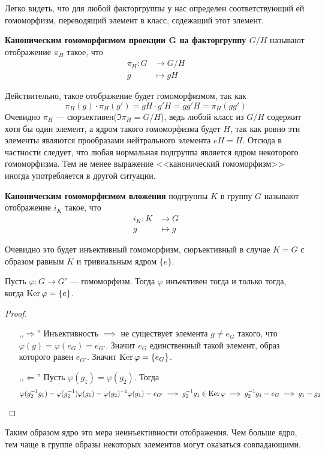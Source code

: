 \documentclass[../main.tex]{subfiles}
\begin{document}
  Легко видеть, что для любой факторгруппы у нас определен соответствующий ей гомоморфизм, переводящий элемент в класс, содежащий этот элемент.
  \begin{definition}
    \textbf{Каноническим гомоморфизмом проекции G на факторгруппу $G/H$} называют отображение $\pi_{H}$ такое, что
    \begin{align*}
        \pi_H\colon G &\longrightarrow G/H \\
        g &\longmapsto gH
    \end{align*}
  \end{definition}
  Действительно, такое отображение будет гомоморфизмом, так как
  \begin{equation*}
    \pi_H(g) \cdot \pi_H(g') = gH \cdot g'H = gg'H = \pi_H(gg')
  \end{equation*}
  Очевидно $\pi_H$ --- сюръективен($\Im \pi_H = G/H$), ведь любой класс из $G/H$ содержит хотя бы один элемент, а ядром такого гомоморфизма будет $H$, так как ровно эти элементы являются прообразами нейтрального элемента $eH = H$. Отсюда в частности следует, что любая нормальная подгруппа является ядром некоторого гомоморфизма. Тем не менее выражение <<канонический гомоморфизм>> иногда употребляется в другой ситуации.
\begin{definition}
  \textbf{Каноническим гомоморфизмом вложения} подгруппы $K$ в группу $G$ называют отображение $i_K$ такое, что
  \begin{align*}
      i_K\colon K &\longrightarrow G\\
      g &\longmapsto g
  \end{align*}
\end{definition}

  Очевидно это будет инъективный гомоморфизм, сюръективный в случае $K = G$ с образом равным $K$ и тривиальным ядром $\{e\}$.
\begin{remark}
  Пусть $\varphi\colon G \to G'$ --- гомоморфизм. Тогда $\varphi$ инъективен тогда и только тогда, когда $\operatorname{Ker} \varphi = \{e\}$.
\end{remark}
\begin{proof}
  \begin{enumerate}
    \item[,,$\Rightarrow$''] Инъективность $\implies$ не существует элемента $g \neq e_G$ такого, что $\varphi(g) = \varphi(e_G) = e_{G'}$. Значит $e_G$ единственный такой элемент, образ которого равен $e_{G'}$. Значит $\operatorname{Ker} \varphi = \{e_G\}$.
    \item[,,$\Leftarrow$''] Пусть $\varphi(g_1) = \varphi(g_2)$. Тогда
    \begin{equation*}
      \varphi(g_2^{-1}g_1) = \varphi(g_2^{-1})\varphi(g_1) = \varphi(g_2)^{-1}\varphi(g_1) = e_{G'} \implies
      g_2^{-1}g_1 \in \operatorname{Ker} \varphi \implies g_2^{-1}g_1 = e_G \implies g_1 = g_2
    \end{equation*}
  \end{enumerate}
\end{proof}
Таким образом ядро это мера неинъективности отображения. Чем больше ядро, тем чаще в группе образы некоторых элементов могут оказаться совпадающими.
\end{document}
